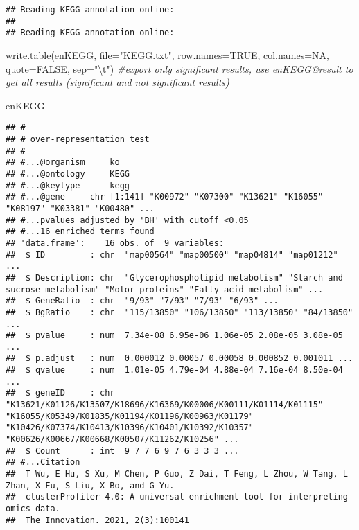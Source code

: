 \documentclass[
]{article}
\newenvironment{Shaded}{\begin{snugshade}}{\end{snugshade}}
\newcommand{\AttributeTok}[1]{\textcolor[rgb]{0.77,0.63,0.00}{#1}}
\newcommand{\CommentTok}[1]{\textcolor[rgb]{0.56,0.35,0.01}{\textit{#1}}}
\newcommand{\ConstantTok}[1]{\textcolor[rgb]{0.00,0.00,0.00}{#1}}
\newcommand{\FunctionTok}[1]{\textcolor[rgb]{0.00,0.00,0.00}{#1}}
\newcommand{\NormalTok}[1]{#1}
\newcommand{\SpecialCharTok}[1]{\textcolor[rgb]{0.00,0.00,0.00}{#1}}
\newcommand{\StringTok}[1]{\textcolor[rgb]{0.31,0.60,0.02}{#1}}
\begin{document}
\begin{verbatim}
## Reading KEGG annotation online:
## 
## Reading KEGG annotation online:
\end{verbatim}

\begin{Shaded}
\begin{Highlighting}[]
\FunctionTok{write.table}\NormalTok{(enKEGG, }\AttributeTok{file=}\StringTok{"KEGG.txt"}\NormalTok{, }\AttributeTok{row.names=}\ConstantTok{TRUE}\NormalTok{, }\AttributeTok{col.names=}\ConstantTok{NA}\NormalTok{, }\AttributeTok{quote=}\ConstantTok{FALSE}\NormalTok{, }\AttributeTok{sep=}\StringTok{"}\SpecialCharTok{\textbackslash{}t}\StringTok{"}\NormalTok{) }\CommentTok{\#export only significant results, use enKEGG@result to get all results (significant and not significant results)}

\NormalTok{enKEGG}
\end{Highlighting}
\end{Shaded}

\begin{verbatim}
## #
## # over-representation test
## #
## #...@organism     ko 
## #...@ontology     KEGG 
## #...@keytype      kegg 
## #...@gene     chr [1:141] "K00972" "K07300" "K13621" "K16055" "K08197" "K03381" "K00480" ...
## #...pvalues adjusted by 'BH' with cutoff <0.05 
## #...16 enriched terms found
## 'data.frame':    16 obs. of  9 variables:
##  $ ID         : chr  "map00564" "map00500" "map04814" "map01212" ...
##  $ Description: chr  "Glycerophospholipid metabolism" "Starch and sucrose metabolism" "Motor proteins" "Fatty acid metabolism" ...
##  $ GeneRatio  : chr  "9/93" "7/93" "7/93" "6/93" ...
##  $ BgRatio    : chr  "115/13850" "106/13850" "113/13850" "84/13850" ...
##  $ pvalue     : num  7.34e-08 6.95e-06 1.06e-05 2.08e-05 3.08e-05 ...
##  $ p.adjust   : num  0.000012 0.00057 0.00058 0.000852 0.001011 ...
##  $ qvalue     : num  1.01e-05 4.79e-04 4.88e-04 7.16e-04 8.50e-04 ...
##  $ geneID     : chr  "K13621/K01126/K13507/K18696/K16369/K00006/K00111/K01114/K01115" "K16055/K05349/K01835/K01194/K01196/K00963/K01179" "K10426/K07374/K10413/K10396/K10401/K10392/K10357" "K00626/K00667/K00668/K00507/K11262/K10256" ...
##  $ Count      : int  9 7 7 6 9 7 6 3 3 3 ...
## #...Citation
##  T Wu, E Hu, S Xu, M Chen, P Guo, Z Dai, T Feng, L Zhou, W Tang, L Zhan, X Fu, S Liu, X Bo, and G Yu.
##  clusterProfiler 4.0: A universal enrichment tool for interpreting omics data.
##  The Innovation. 2021, 2(3):100141
\end{verbatim}
\end{document}
